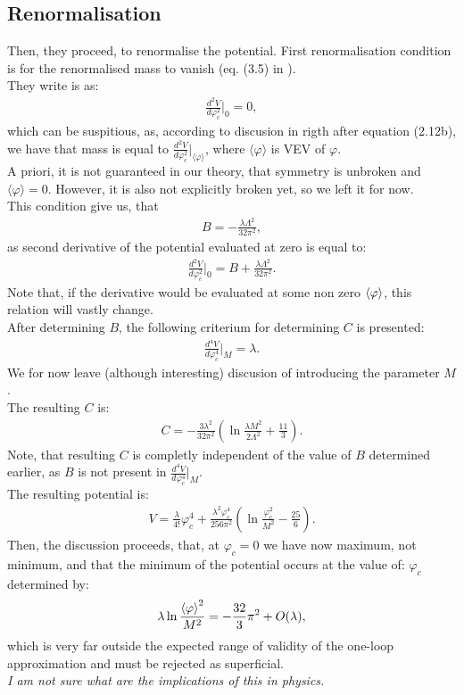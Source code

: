 \subsection{Renormalisation}
Then, they proceed, to renormalise the potential. First renormalisation condition is for the 
renormalised mass to vanish (eq. (3.5) in \cite{Coleman1973}). \\
They write is as:
\begin{align}
\frac{d^2V}{d\varphi_c^2}\Big|_0=0,
\end{align}
which can be suspitious, as, according to discusion in \cite{Coleman1973} rigth after equation 
(2.12b), we have that mass is equal to $\frac{d^2V}{d\varphi_c^2}\Big|_{\langle\varphi\rangle}$, 
where $\langle\varphi\rangle$ is VEV of $\varphi$. \\
A priori, it is not guaranteed in our theory, that symmetry is unbroken and 
$\langle\varphi\rangle = 0$. However, it is also not explicitly broken yet, so we left it for now. 
\\
This condition give us, that 
\begin{align}
B = -\frac{\lambda\Lambda^2}{32\pi^2},
\end{align}
as second derivative of the potential evaluated at zero is equal to:
\begin{align}
\frac{d^2V}{d\varphi_c^2}\Big|_0 = B+\frac{\lambda\Lambda^2}{32\pi^2}.
\end{align}
Note that, if the derivative would be evaluated at some non zero ${\langle\varphi\rangle}$, this relation will 
vastly change. \\
After determining $B$, the following criterium for determining $C$ is presented:
\begin{align}
\frac{d^4V}{d\varphi_c^4}\Big|_M=\lambda.
\end{align}
We for now leave (although interesting) discusion of introducing the parameter $M$. \\
The resulting $C$ is:
\begin{align}
C=-\frac{3\lambda^2}{32\pi^2}\left(\ln\frac{\lambda M^2}{2\Lambda^2}+\frac{11}{3}\right).
\end{align}
Note, that resulting $C$ is completly independent of the value of $B$ determined 
earlier\label{CBreason}, as $B$ is not present in $\frac{d^4V}{d\varphi_c^4}\Big|_M$. \\
The resulting potential is:
\begin{align}
V=\frac{\lambda}{4!}\varphi_c^4+\frac{\lambda^2\varphi_c^4}{256\pi^2}\left(\ln
\frac{\varphi_c^2}{M^2}-\frac{25}{6}\right).
\end{align}
Then, the discussion proceeds, that, at $\varphi_c = 0$ we have now maximum, not minimum, 
and that the minimum of the potential occurs at the value of: 
$\varphi_c$ determined by:
\begin{align}
\lambda\ln\frac{{\langle\varphi\rangle}^2}{M^2}=-\frac{32}{3}\pi^2+O(\lambda),
\end{align}
which is very far outside the expected range of validity of the one-loop approximation and must be 
rejected as superficial. \\
\textit{I am not sure what are the implications of this in physics.}
